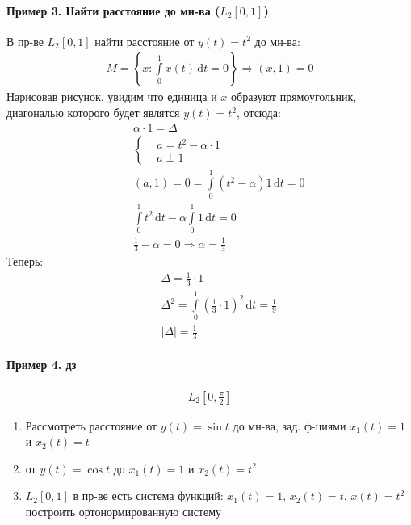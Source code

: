 \documentclass{article}[12pt]
\renewcommand{\d}{\,\mathrm{d}}
\begin{document}
\paragraph{Пример 3. Найти расстояние до мн-ва ($L_{2}[0,1]$)}
В пр-ве $L_{2}[0,1]$ найти расстояние от $y(t)=t^{2}$ до мн-ва:
\begin{eqnarray*}
    M=\left\{x:\int\limits_{0}^{1}x(t)\d{t}=0\right\}
    \Rightarrow (x,1)=0
\end{eqnarray*}
Нарисовав рисунок, увидим что единица и $x$ образуют прямоугольник,
диагональю которого будет являтся $y(t)=t^{2}$, отсюда:
\begin{eqnarray*}
&&\alpha\cdot 1=\Delta\\
&&\left\{\begin{aligned}
&a=t^{2}-\alpha\cdot 1\\
&a\perp 1
\end{aligned} \right.\\
&&(a,1)=0=\int\limits_{0}^{1}(t^{2}-\alpha)1\d{t}=0\\
&&\int\limits_{0}^{1}t^{2}\d{t}-\alpha\int\limits_{0}^{1}1\d{t}=0\\
&&\frac{1}{3}-\alpha=0 \Rightarrow \alpha = \frac{1}{3}
\end{eqnarray*}
Теперь:
\begin{eqnarray*}
&&\Delta=\frac{1}{3}\cdot 1\\
&&\Delta^{2}=\int\limits_{0}^{1}\left(\frac{1}{3}\cdot
1\right)^{2}\d{t}=\frac{1}{9}\\
&&|\Delta|=\frac{1}{3}
\end{eqnarray*}

\paragraph{Пример 4. дз}
\begin{eqnarray*}
    L_{2}[0,\frac{\pi}{2}]
\end{eqnarray*}
\begin{enumerate}
\item
    Рассмотреть расстояние от $y(t)=\sin{t}$ до мн-ва, зад. ф-циями
    $x_{1}(t)=1$ и $x_{2}(t)=t$
\item
    от $y(t)=\cos{t}$ до $x_{1}(t)=1$ и $x_{2}(t)=t^{2}$
\item
    $L_{2}[0,1]$ в пр-ве есть система функций: $x_{1}(t)=1$,
    $x_{2}(t)=t$, $x(t)=t^{2}$ построить ортонормированную систему
\end{enumerate}
\end{document}
